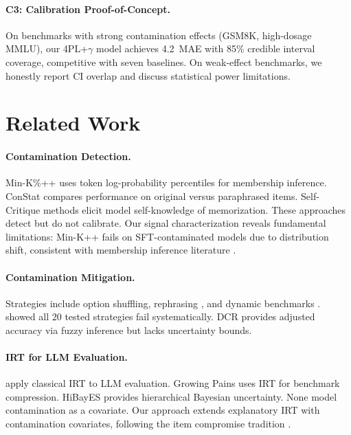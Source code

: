 \documentclass[11pt,a4paper]{article}
\newcommand{\pp}{\,\text{pp}}
\begin{document}
\paragraph{C3: Calibration Proof-of-Concept.}
On benchmarks with strong contamination effects (GSM8K, high-dosage MMLU), our 4PL+$\gamma$ model achieves 4.2\pp{} MAE with 85\% credible interval coverage, competitive with seven baselines.
On weak-effect benchmarks, we honestly report CI overlap and discuss statistical power limitations.

\section{Related Work}
\label{sec:related}

\paragraph{Contamination Detection.}
Min-K\%++ \citep{shi2024detecting} uses token log-probability percentiles for membership inference.
ConStat \citep{yang2023rethinking} compares performance on original versus paraphrased items.
Self-Critique methods \citep{golchin2024time} elicit model self-knowledge of memorization.
These approaches detect but do not calibrate.
Our signal characterization reveals fundamental limitations: Min-K++ fails on SFT-contaminated models due to distribution shift, consistent with membership inference literature \citep{shokri2017membership,carlini2022quantifying}.

\paragraph{Contamination Mitigation.}
Strategies include option shuffling, rephrasing \citep{li2024task}, and dynamic benchmarks \citep{white2024livebench}.
\citet{zhang2025emperor} showed all 20 tested strategies fail systematically.
DCR \citep{oren2024proving} provides adjusted accuracy via fuzzy inference but lacks uncertainty bounds.

\paragraph{IRT for LLM Evaluation.}
\citet{lalor2024benchmarking} apply classical IRT to LLM evaluation.
Growing Pains \citep{polo2024tinybenchmarks} uses IRT for benchmark compression.
HiBayES provides hierarchical Bayesian uncertainty.
None model contamination as a covariate.
Our approach extends explanatory IRT \citep{deboeck2004explanatory} with contamination covariates, following the item compromise tradition \citep{eckerly2017detecting,sinharay2017assessment}.
\end{document}
